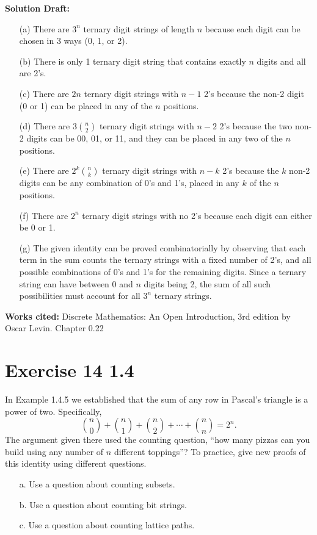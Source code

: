 \documentclass{article}
\begin{document}
\vspace{0.5cm}
\noindent\textbf{Solution Draft:} 
\vspace{0.2cm}

\begin{enumerate}
    \item[(a)] There are \( 3^n \) ternary digit strings of length \( n \) because each digit can be chosen in 3 ways (0, 1, or 2).
    \item[(b)] There is only 1 ternary digit string that contains exactly \( n \) digits and all are 2's.
    \item[(c)] There are \( 2n \) ternary digit strings with \( n - 1 \) 2's because the non-2 digit (0 or 1) can be placed in any of the \( n \) positions.
    \item[(d)] There are \( 3 \binom{n}{2} \) ternary digit strings with \( n - 2 \) 2's because the two non-2 digits can be 00, 01, or 11, and they can be placed in any two of the \( n \) positions.
    \item[(e)] There are \( 2^k \binom{n}{k} \) ternary digit strings with \( n - k \) 2's because the \( k \) non-2 digits can be any combination of 0's and 1's, placed in any \( k \) of the \( n \) positions.
    \item[(f)] There are \( 2^n \) ternary digit strings with no 2's because each digit can either be 0 or 1.
    \item[(g)] The given identity can be proved combinatorially by observing that each term in the sum counts the ternary strings with a fixed number of 2's, and all possible combinations of 0's and 1's for the remaining digits. Since a ternary string can have between 0 and \( n \) digits being 2, the sum of all such possibilities must account for all \( 3^n \) ternary strings.
\end{enumerate}
\vspace{0.5cm}
\textbf{Works cited:}
Discrete Mathematics: An Open Introduction, 3rd edition by Oscar Levin. Chapter 0.22
\section*{Exercise 14 1.4}  

In Example 1.4.5 we established that the sum of any row in Pascal's triangle is a power of two. Specifically,
\[
\binom{n}{0} + \binom{n}{1} + \binom{n}{2} + \cdots + \binom{n}{n} = 2^n.
\]
The argument given there used the counting question, ``how many pizzas can you build using any number of \( n \) different toppings''? To practice, give new proofs of this identity using different questions.
\begin{enumerate}
    \item[a.] Use a question about counting subsets.
    \item[b.] Use a question about counting bit strings.
    \item[c.] Use a question about counting lattice paths.
\end{enumerate}
\end{document}
